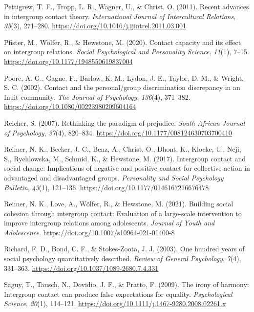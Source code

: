 \documentclass[twocolumn, 11pt, letterpaper]{article}
\begin{document}
\leavevmode\hypertarget{ref-pettigrew_recent_2011}{}%
Pettigrew, T. F., Tropp, L. R., Wagner, U., \& Christ, O. (2011). Recent
advances in intergroup contact theory. \emph{International Journal of
Intercultural Relations}, \emph{35}(3), 271--280.
\url{https://doi.org/10.1016/j.ijintrel.2011.03.001}

\leavevmode\hypertarget{ref-pfister_contact_2020}{}%
Pfister, M., Wölfer, R., \& Hewstone, M. (2020). Contact capacity and
its effect on intergroup relations. \emph{Social Psychological and
Personality Science}, \emph{11}(1), 7--15.
\url{https://doi.org/10.1177/1948550619837004}

\leavevmode\hypertarget{ref-poore_contact_2002}{}%
Poore, A. G., Gagne, F., Barlow, K. M., Lydon, J. E., Taylor, D. M., \&
Wright, S. C. (2002). Contact and the personal/group discrimination
discrepancy in an Inuit community. \emph{The Journal of Psychology},
\emph{136}(4), 371--382. \url{https://doi.org/10.1080/00223980209604164}

\leavevmode\hypertarget{ref-reicher_rethinking_2007}{}%
Reicher, S. (2007). Rethinking the paradigm of prejudice. \emph{South
African Journal of Psychology}, \emph{37}(4), 820--834.
\url{https://doi.org/10.1177/008124630703700410}

\leavevmode\hypertarget{ref-reimer_intergroup_2017}{}%
Reimer, N. K., Becker, J. C., Benz, A., Christ, O., Dhont, K., Klocke,
U., Neji, S., Rychlowska, M., Schmid, K., \& Hewstone, M. (2017).
Intergroup contact and social change: Implications of negative and
positive contact for collective action in advantaged and disadvantaged
groups. \emph{Personality and Social Psychology Bulletin}, \emph{43}(1),
121--136. \url{https://doi.org/10.1177/0146167216676478}

\leavevmode\hypertarget{ref-reimer_building_2021}{}%
Reimer, N. K., Love, A., Wölfer, R., \& Hewstone, M. (2021). Building
social cohesion through intergroup contact: Evaluation of a large-scale
intervention to improve intergroup relations among adolescents.
\emph{Journal of Youth and Adolescence}.
\url{https://doi.org/10.1007/s10964-021-01400-8}

\leavevmode\hypertarget{ref-richard_one_2003}{}%
Richard, F. D., Bond, C. F., \& Stokes-Zoota, J. J. (2003). One hundred
years of social psychology quantitatively described. \emph{Review of
General Psychology}, \emph{7}(4), 331--363.
\url{https://doi.org/10.1037/1089-2680.7.4.331}

\leavevmode\hypertarget{ref-saguy_irony_2009}{}%
Saguy, T., Tausch, N., Dovidio, J. F., \& Pratto, F. (2009). The irony
of harmony: Intergroup contact can produce false expectations for
equality. \emph{Psychological Science}, \emph{20}(1), 114--121.
\url{https://doi.org/10.1111/j.1467-9280.2008.02261.x}
\end{document}

